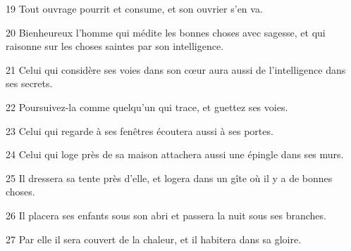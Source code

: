 \par 19 Tout ouvrage pourrit et consume, et son ouvrier s'en va.
\par 20 Bienheureux l'homme qui médite les bonnes choses avec sagesse, et qui raisonne sur les choses saintes par son intelligence.
\par 21 Celui qui considère ses voies dans son cœur aura aussi de l'intelligence dans ses secrets.
\par 22 Poursuivez-la comme quelqu'un qui trace, et guettez ses voies.
\par 23 Celui qui regarde à ses fenêtres écoutera aussi à ses portes.
\par 24 Celui qui loge près de sa maison attachera aussi une épingle dans ses murs.
\par 25 Il dressera sa tente près d'elle, et logera dans un gîte où il y a de bonnes choses.
\par 26 Il placera ses enfants sous son abri et passera la nuit sous ses branches.
\par 27 Par elle il sera couvert de la chaleur, et il habitera dans sa gloire.


